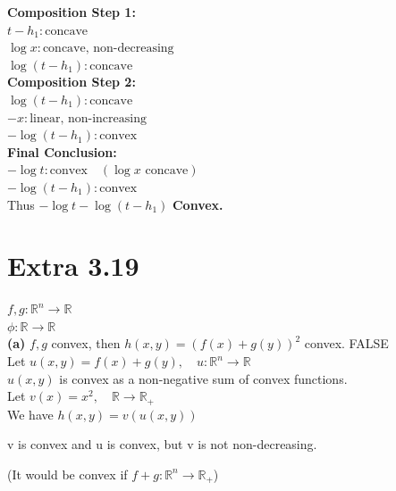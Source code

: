 \documentclass{article}
\begin{document}
\noindent \textbf{Composition Step 1:} \\
\indent $t - h_1 : \text{concave}$ \\
\indent $\log x : \text{concave, non-decreasing}$ \\
\indent $\log(t - h_1) : \text{concave}$ \\[1.5em]

\noindent \textbf{Composition Step 2:} \\
\indent $\log(t - h_1) : \text{concave}$ \\
\indent $-x : \text{linear, non-increasing}$ \\
\indent $-\log(t - h_1) : \text{convex}$ \\[1.5em]

\noindent \textbf{Final Conclusion:} \\
\indent $-\log t : \text{convex} \quad (\log x \text{ concave})$ \\
\indent $-\log(t - h_1) : \text{convex}$ \\
\indent Thus $-\log t - \log(t - h_1)$ \textbf{ Convex.}







\newpage
\section*{Extra 3.19}

\noindent $f, g : \mathbb{R}^n \to \mathbb{R}$ \\
$\phi : \mathbb{R} \to \mathbb{R}$ \\

\noindent \textbf{(a)} $f, g$ convex, then $h(x, y) = (f(x) + g(y))^2$ convex. FALSE \\


\noindent Let $u(x, y) = f(x) + g(y), \quad u : \mathbb{R}^n \to \mathbb{R}$ \\
\indent $u(x, y)$ is convex as a non-negative sum of convex functions. \\

\noindent Let $v(x) = x^2, \quad \mathbb{R} \to \mathbb{R}_+$ \\

\noindent We have $h(x, y) = v(u(x, y))$

\noindent v is convex and u is convex, 
\noindent but v is not non-decreasing.

\noindent (It would be convex if $f+g:  \mathbb{R}^n \to \mathbb{R}_+ $)
\end{document}

